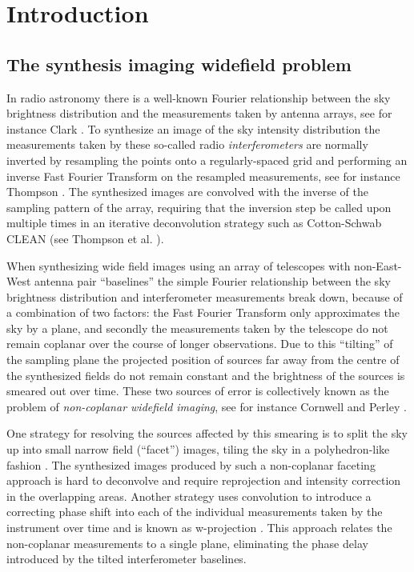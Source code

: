 \chapter{Introduction}
\section{The synthesis imaging widefield problem}
In radio astronomy there is a well-known Fourier relationship between the sky brightness distribution and the measurements taken by antenna arrays, see for instance 
Clark \cite[Lecture 1]{taylor1999synthesis}. To synthesize an image of the sky intensity distribution the measurements taken by these so-called radio \textit{interferometers}
are normally inverted by resampling the points onto a regularly-spaced grid and performing an inverse Fast Fourier Transform \cite{cochran1967fast} on the resampled measurements, see for instance 
Thompson \cite{thompson1974interpolation}. The synthesized images are convolved with the inverse of the sampling pattern of the array, requiring that
the inversion step be called upon multiple times in an iterative deconvolution strategy such as Cotton-Schwab CLEAN (see Thompson et al. \cite[ch 11]{thompson2008interferometry}).

When synthesizing wide field images using an array of telescopes with non-East-West antenna pair ``baselines'' the simple Fourier relationship between the sky brightness 
distribution and interferometer measurements break down, because of a combination of two factors: the Fast Fourier Transform only approximates the sky by a plane, and secondly 
the measurements taken by the telescope do not remain coplanar over the course of longer observations. Due to this ``tilting'' of the sampling plane the projected position of 
sources far away from the centre of the synthesized fields do not remain constant and the brightness of the sources is smeared out over time. These two sources of error is 
collectively known as the problem of \textit{non-coplanar widefield imaging}, see for instance Cornwell and Perley \cite{cornwell1992radio}.

One strategy for resolving the sources affected by this smearing is to split the sky up into small narrow field (``facet'') images, tiling the sky in a 
polyhedron-like fashion \cite{cornwell1992radio}. The synthesized images produced by such a non-coplanar faceting approach is hard to deconvolve and 
require reprojection and intensity correction in the overlapping areas. Another strategy uses 
convolution to introduce a correcting phase shift into each of the individual measurements taken by the instrument over time and is known as w-projection \cite{cornwell2008noncoplanar}. This approach
relates the non-coplanar measurements to a single plane, eliminating the phase delay introduced by the tilted interferometer baselines. 

